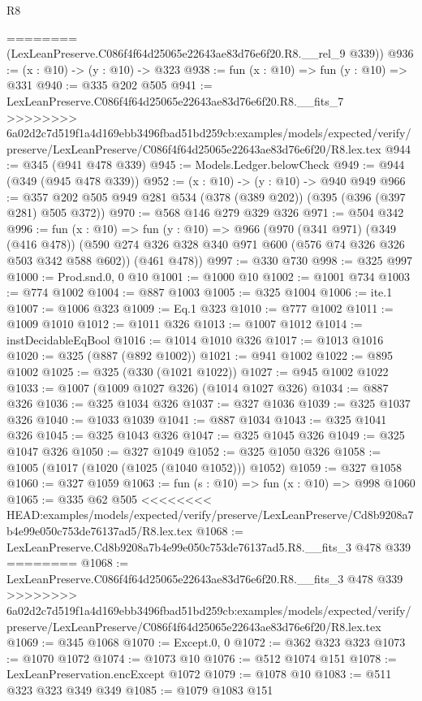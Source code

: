 \begin{lexlean}{R8}
\begin{coremodule}
{{{{{{{{{{{{{{{{{{{{{{{========
      (LexLeanPreserve.C086f4f64d25065e22643ae83d76e6f20.R8.__rel_9 @339))
@936 := (x : @10) -> (y : @10) -> @323
@938 := fun (x : @10) => fun (y : @10) => @331
@940 := @335 @202 @505
@941 := LexLeanPreserve.C086f4f64d25065e22643ae83d76e6f20.R8.__fits_7
>>>>>>>> 6a02d2c7d519f1a4d169ebb3496fbad51bd259cb:examples/models/expected/verify/preserve/LexLeanPreserve/C086f4f64d25065e22643ae83d76e6f20/R8.lex.tex
@944 := @345 (@941 @478 @339)
@945 := Models.Ledger.belowCheck
@949 := @944 (@349 (@945 @478 @339))
@952 := (x : @10) -> (y : @10) -> @940 @949
@966 := @357 @202 @505 @949 @281 @534 (@378 (@389 @202)) (@395 (@396 (@397 @281) @505 @372))
@970 := @568 @146 @279 @329 @326
@971 := @504 @342
@996 := fun (x : @10) =>
  fun (y : @10) =>
  @966
    (@970
      (@341 @971)
      (@349 (@416 @478))
      (@590 @274 @326 @328 @340 @971 @600 (@576 @74 @326 @326 @503 @342 @588 @602))
      (@461 @478))
@997 := @330 @730
@998 := @325 @997
@1000 := Prod.snd.{0, 0} @10
@1001 := @1000 @10
@1002 := @1001 @734
@1003 := @774 @1002
@1004 := @887 @1003
@1005 := @325 @1004
@1006 := ite.{1}
@1007 := @1006 @323
@1009 := Eq.{1} @323
@1010 := @777 @1002
@1011 := @1009 @1010
@1012 := @1011 @326
@1013 := @1007 @1012
@1014 := instDecidableEqBool
@1016 := @1014 @1010 @326
@1017 := @1013 @1016
@1020 := @325 (@887 (@892 @1002))
@1021 := @941 @1002
@1022 := @895 @1002
@1025 := @325 (@330 (@1021 @1022))
@1027 := @945 @1002 @1022
@1033 := @1007 (@1009 @1027 @326) (@1014 @1027 @326)
@1034 := @887 @326
@1036 := @325 @1034 @326
@1037 := @327 @1036
@1039 := @325 @1037 @326
@1040 := @1033 @1039
@1041 := @887 @1034
@1043 := @325 @1041 @326
@1045 := @325 @1043 @326
@1047 := @325 @1045 @326
@1049 := @325 @1047 @326
@1050 := @327 @1049
@1052 := @325 @1050 @326
@1058 := @1005 (@1017 (@1020 (@1025 (@1040 @1052))) @1052)
@1059 := @327 @1058
@1060 := @327 @1059
@1063 := fun (s : @10) => fun (x : @10) => @998 @1060
@1065 := @335 @62 @505
<<<<<<<< HEAD:examples/models/expected/verify/preserve/LexLeanPreserve/Cd8b9208a7b4e99e050c753de76137ad5/R8.lex.tex
@1068 := LexLeanPreserve.Cd8b9208a7b4e99e050c753de76137ad5.R8.__fits_3 @478 @339
========
@1068 := LexLeanPreserve.C086f4f64d25065e22643ae83d76e6f20.R8.__fits_3 @478 @339
>>>>>>>> 6a02d2c7d519f1a4d169ebb3496fbad51bd259cb:examples/models/expected/verify/preserve/LexLeanPreserve/C086f4f64d25065e22643ae83d76e6f20/R8.lex.tex
@1069 := @345 @1068
@1070 := Except.{0, 0}
@1072 := @362 @323 @323
@1073 := @1070 @1072
@1074 := @1073 @10
@1076 := @512 @1074 @151
@1078 := LexLeanPreservation.encExcept @1072
@1079 := @1078 @10
@1083 := @511 @323 @323 @349 @349
@1085 := @1079 @1083 @151
}}}}}}}}}}}}}}}}}}}}}}}
\end{coremodule}
\end{lexlean}
